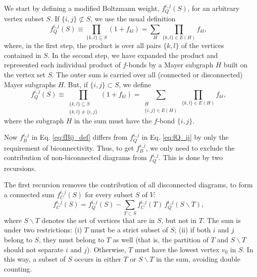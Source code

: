 \documentclass[aip,jcp,preprint,superscriptaddress,showpacs,preprintnumbers,amsmath,amssymb]{revtex4-1}
\numberwithin{equation}{section}
\begin{document}
We start by defining a modified Boltzmann weight,
$f_Q^{i,j}(S)$, for an arbitrary vertex subset $S$.
%
If $\{i, j\} \not\subset S$,
we use the usual definition
%
\[
f_Q^{i,j}(S)
\equiv
\prod_{\{k,l\}\subseteq S} (1 + f_{kl})
=
\sum_H
\prod_{\{k,l\} \in E(H)} f_{kl},
\]
%
where, in the first step,
the product is over all pairs $\{k, l\}$
of the vertices contained in $S$.
%
In the second step,
we have expanded the product
and represented each individual product of $f$-bonds
by a Mayer subgraph $H$ built on the vertex set $S$.
%
The outer sum is carried over all
(connected or disconnected) Mayer subgraphs $H$.
%
But, if $\{i, j\} \subset S$,
we define
%
%
%
\begin{equation}
f_Q^{i,j}(S)
\equiv
\prod_{ \substack{
  \{k,l\}\subseteq S \\
  \{k,l\} \ne \{i, j\} } }
(1 + f_{kl})
=
\sum_{ \substack{
  H \\
  \{i, j\} \in E(H) } }
\prod_{\{k,l\} \in E(H)} f_{kl},
\label{eq:fQ_ij}
\end{equation}
%
%
%
where the subgraph $H$
in the sum must have the $f$-bond $\{i, j\}$.



Now $f_B^{i,j}$ in Eq. \eqref{eq:fBij_def}
differs from $f_Q^{i,j}$ in Eq. \eqref{eq:fQ_ij}
by only the requirement of biconnectivity.
%
Thus,
to get $f_B^{i,j}$,
we only need to exclude the contribution of non-biconnected
diagrams from $f_Q^{i,j}$.
%
This is done by two recursions\cite{wheatley2013}.



The first recursion removes the contribution
of all disconnected diagrams,
to form a connected sum $f_C^{i,j}(S)$
for every subset $S$ of $V$\cite{wheatley2013}:
%
%
%
\begin{equation}
f_C^{i,j}(S)
=
f_Q^{i,j}(S)
-
\sum_{T \subset S}
f_C^{i,j}(T) \, f_Q^{i,j}(S \backslash T),
\label{eq:fC_from_fQ}
\end{equation}
%
%
%
where $S\backslash T$ denotes the set of vertices
that are in $S$, but not in $T$.
%
The sum is under two restrictions:
%
(i) $T$ must be a strict subset of $S$;
%
(ii) if both $i$ and $j$ belong to $S$,
they must belong to $T$ as well
(that is, the partition of $T$ and $S \backslash T$
should not separate $i$ and $j$).
%
Otherwise, $T$ must have the lowest vertex $v_0$ in $S$.
%
In this way,
a subset of $S$ occurs in either $T$ or $S \backslash T$
in the sum,
avoiding double counting.
\end{document}
